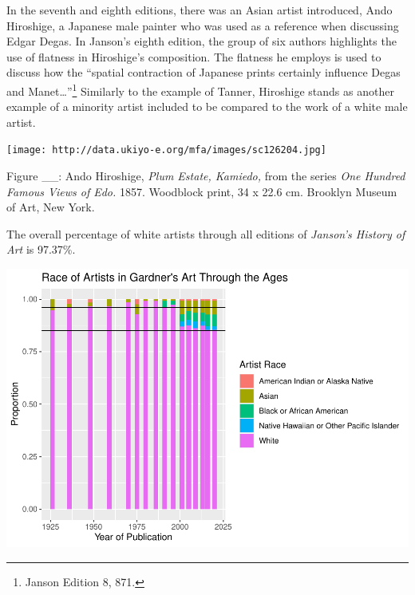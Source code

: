 \documentclass[
  letterpaper,
  DIV=11,
  numbers=noendperiod]{scrreprt}
\begin{document}
In the seventh and eighth editions, there was an Asian artist
introduced, Ando Hiroshige, a Japanese male painter who was used as a
reference when discussing Edgar Degas. In Janson's eighth edition, the
group of six authors highlights the use of flatness in Hiroshige's
composition. The flatness he employs is used to discuss how the
``spatial contraction of Japanese prints certainly influence Degas and
Manet\ldots{}''\footnote{Janson Edition 8, 871.} Similarly to the
example of Tanner, Hiroshige stands as another example of a minority
artist included to be compared to the work of a white male artist.

\texttt{[image: http://data.ukiyo-e.org/mfa/images/sc126204.jpg]}

Figure \_\_: Ando Hiroshige, \emph{Plum Estate, Kamiedo,} from the
series \emph{One Hundred Famous Views of Edo.} 1857. Woodblock print, 34
x 22.6 cm. Brooklyn Museum of Art, New York.

The overall percentage of white artists through all editions of
\emph{Janson's History of Art} is 97.37\%.

\includegraphics{Chapter1/Chapter1_files/figure-pdf/gardnerracethroughtime-1.pdf}
\end{document}
